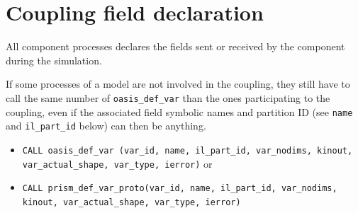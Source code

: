 
\section{Coupling field declaration}
\label{subsubsec_Declaration}

All component processes declares the fields sent or received by the
component during the simulation.
 
If some processes of a model are not involved in the coupling, they
still have to call the same number of {\tt oasis\_def\_var} than the
ones participating to the coupling, even if the associated field
symbolic names and partition ID (see {\tt name} and {\tt il\_part\_id}
below) can then be anything.

\begin{itemize}

\item {\tt CALL oasis\_def\_var (var\_id, name, il\_part\_id,
    var\_nodims, kinout, \newline var\_actual\_shape, var\_type,
    ierror)} or

\item {\tt CALL prism\_def\_var\_proto(var\_id, name, il\_part\_id,
    var\_nodims, kinout, var\_actual\_shape, var\_type, ierror)}


\end{itemize}
